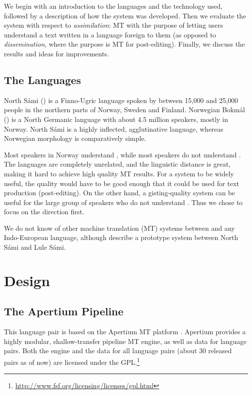 \documentclass{book}
\begin{document}
We begin with an introduction to the languages and the technology
used, followed by a description of how the system was developed. Then
we evaluate the system with respect to \textit{assimilation}: MT with
the purpose of letting users understand a text written in a language
foreign to them (as opposed to \textit{dissemination}, where the
purpose is MT for post-editing). Finally, we discuss the results and
ideas for improvements.


\subsection{The Languages}
North S\'{a}mi (\sme{}) is a Finno-Ugric language spoken by between 
15,000 and 25,000 people in the northern parts of Norway, Sweden and
Finland. Norwegian Bokm{\aa}l (\nob{}) is a North Germanic language
with about 4.5 million speakers, mostly in Norway. North S\'{a}mi %
is a highly inflected, agglutinative language, whereas Norwegian
morphology is comparatively simple.

Most \sme{} speakers in Norway understand \nob{}, while most \nob{}
speakers do not understand \sme{}. The languages are completely
unrelated, and the linguistic distance is great, making it hard to
achieve high quality MT results. For a \nobsme{} system to be widely
useful, the quality would have to be good enough that it could be used
for text production (post-editing). On the other hand, a \smenob{}
gisting-quality system can be useful for the large group of \nob{}
speakers who do not understand \sme{}. Thus we chose to focus on the
\smenob{} direction first.

We do not know of other machine translation (MT) systems between \sme{}
and any Indo-European language, although \citet{tyers2009dpm} describe %
a prototype system between North S\'{a}mi and Lule S\'{a}mi.



\section{Design}
 \label{sec:design}

\subsection{The Apertium Pipeline}
This language pair is based on the Apertium MT
platform \citep{forcada2011afp,zubizarreta2009amt}. Apertium provides a
highly modular, shallow-transfer pipeline MT engine, as well as data
for language pairs. Both the engine and the data for all language
pairs (about 30 released pairs as of now) are licensed under the
GPL.\footnote{\href{http://www.fsf.org/licensing/licenses/gpl.html}{http://www.fsf.org/licensing/licenses/gpl.html}}
\end{document}
